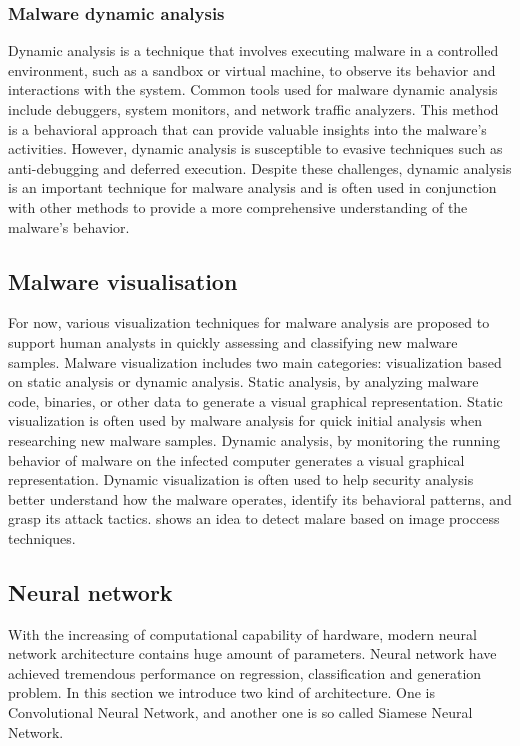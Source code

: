 \documentclass{article}
\begin{document}
\subsubsection{Malware dynamic analysis}
Dynamic analysis is a technique that involves executing malware in a controlled environment, such as a sandbox or virtual machine, to observe its behavior and interactions with the system. Common tools used for malware dynamic analysis include debuggers, system monitors, and network traffic analyzers. This method is a behavioral approach that can provide valuable insights into the malware's activities. However, dynamic analysis is susceptible to evasive techniques such as anti-debugging and deferred execution. Despite these challenges, dynamic analysis is an important technique for malware analysis and is often used in conjunction with other methods to provide a more comprehensive understanding of the malware's behavior.
\subsection{Malware visualisation}
For now, various visualization techniques for malware analysis are proposed to support human analysts in quickly assessing and classifying new malware samples. Malware visualization includes two main categories: visualization based on static analysis or dynamic analysis. Static analysis, by analyzing malware code, binaries, or other data to generate a visual graphical representation. Static visualization is often used by malware analysis for quick initial analysis when researching new malware samples. Dynamic analysis, by monitoring the running behavior of malware on the infected computer generates a visual graphical representation. Dynamic visualization is often used to help security analysis better understand how the malware operates, identify its behavioral patterns, and grasp its attack tactics.
\cite{ref2} shows an idea to detect malare based on image proccess techniques.
\subsection{Neural network} 
With the increasing of computational capability of hardware, modern neural network architecture contains huge amount of parameters.
Neural network have achieved tremendous performance on regression, classification and generation problem.
In this section we introduce two kind of architecture. One is Convolutional Neural Network, and another one is so called Siamese Neural Network.
\end{document}
